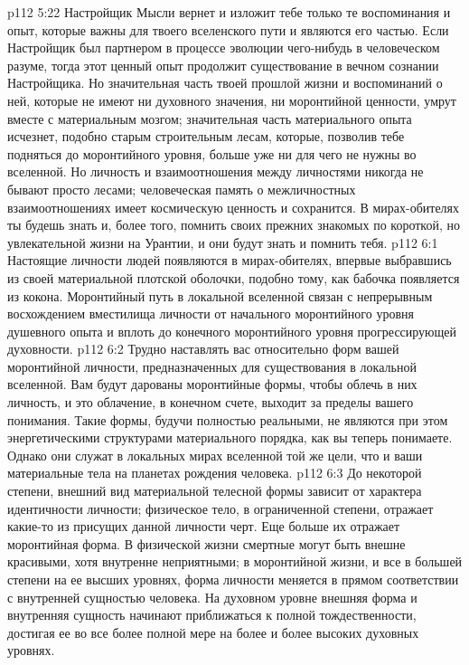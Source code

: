 \vs p112 5:22 Настройщик Мысли вернет и изложит тебе только те воспоминания и опыт, которые важны для твоего вселенского пути и являются его частью. Если Настройщик был партнером в процессе эволюции чего\hyp{}нибудь в человеческом разуме, тогда этот ценный опыт продолжит существование в вечном сознании Настройщика. Но значительная часть твоей прошлой жизни и воспоминаний о ней, которые не имеют ни духовного значения, ни моронтийной ценности, умрут вместе с материальным мозгом; значительная часть материального опыта исчезнет, подобно старым строительным лесам, которые, позволив тебе подняться до моронтийного уровня, больше уже ни для чего не нужны во вселенной. Но личность и взаимоотношения между личностями никогда не бывают просто лесами; человеческая память о межличностных взаимоотношениях имеет космическую ценность и сохранится. В мирах\hyp{}обителях ты будешь знать и, более того, помнить своих прежних знакомых по короткой, но увлекательной жизни на Урантии, и они будут знать и помнить тебя.
\vs p112 6:1 Настоящие личности людей появляются в мирах\hyp{}обителях, впервые выбравшись из своей материальной плотской оболочки, подобно тому, как бабочка появляется из кокона. Моронтийный путь в локальной вселенной связан с непрерывным восхождением вместилища личности от начального моронтийного уровня душевного опыта и вплоть до конечного моронтийного уровня прогрессирующей духовности.
\vs p112 6:2 Трудно наставлять вас относительно форм вашей моронтийной личности, предназначенных для существования в локальной вселенной. Вам будут дарованы моронтийные формы, чтобы облечь в них личность, и это облачение, в конечном счете, выходит за пределы вашего понимания. Такие формы, будучи полностью реальными, не являются при этом энергетическими структурами материального порядка, как вы теперь понимаете. Однако они служат в локальных мирах вселенной той же цели, что и ваши материальные тела на планетах рождения человека.
\vs p112 6:3 До некоторой степени, внешний вид материальной телесной формы зависит от характера идентичности личности; физическое тело, в ограниченной степени, отражает какие\hyp{}то из присущих данной личности черт. Еще больше их отражает моронтийная форма. В физической жизни смертные могут быть внешне красивыми, хотя внутренне неприятными; в моронтийной жизни, и все в большей степени на ее высших уровнях, форма личности меняется в прямом соответствии с внутренней сущностью человека. На духовном уровне внешняя форма и внутренняя сущность начинают приближаться к полной тождественности, достигая ее во все более полной мере на более и более высоких духовных уровнях.
